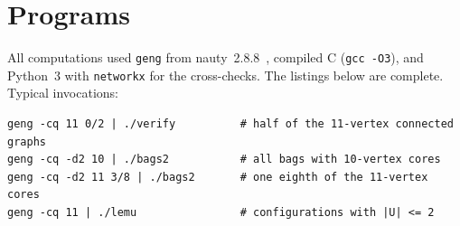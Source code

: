 \documentclass[11pt]{amsart}
\theoremstyle{definition}
\begin{document}
\appendix
\section{Programs}\label{app:code}

All computations used \texttt{geng} from nauty~2.8.8~\cite{nauty}, compiled C (\texttt{gcc -O3}), and Python~3 with
\texttt{networkx} for the cross-checks. The listings below are complete. Typical invocations:
\begin{lstlisting}[frame=none]
geng -cq 11 0/2 | ./verify          # half of the 11-vertex connected graphs
geng -cq -d2 10 | ./bags2           # all bags with 10-vertex cores
geng -cq -d2 11 3/8 | ./bags2       # one eighth of the 11-vertex cores
geng -cq 11 | ./lemu                # configurations with |U| <= 2
\end{lstlisting}
\end{document}
